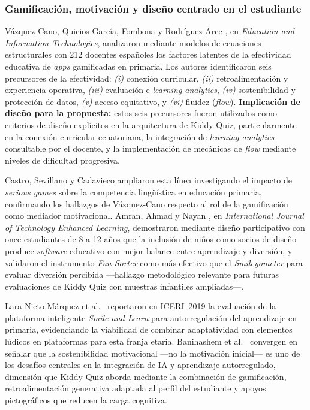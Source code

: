 \subsubsection{Gamificación, motivación y diseño centrado en el estudiante}

Vázquez-Cano, Quicios-García, Fombona y Rodríguez-Arce \cite{vazquezcano2023gamified}, en \textit{Education and Information Technologies}, analizaron mediante modelos de ecuaciones estructurales con 212 docentes españoles los factores latentes de la efectividad educativa de \textit{apps} gamificadas en primaria. Los autores identificaron seis precursores de la efectividad: \textit{(i)} conexión curricular, \textit{(ii)} retroalimentación y experiencia operativa, \textit{(iii)} evaluación e \textit{learning analytics}, \textit{(iv)} sostenibilidad y protección de datos, \textit{(v)} acceso equitativo, y \textit{(vi)} fluidez (\textit{flow}). \textbf{Implicación de diseño para la propuesta:} estos seis precursores fueron utilizados como criterios de diseño explícitos en la arquitectura de Kiddy Quiz, particularmente en la conexión curricular ecuatoriana, la integración de \textit{learning analytics} consultable por el docente, y la implementación de mecánicas de \textit{flow} mediante niveles de dificultad progresiva.

Castro, Sevillano y Cadavieco \cite{castro2024seriousgames,castro2023seriousgames} ampliaron esta línea investigando el impacto de \textit{serious games} sobre la competencia lingüística en educación primaria, confirmando los hallazgos de Vázquez-Cano respecto al rol de la gamificación como mediador motivacional. Amran, Ahmad y Nayan \cite{amran2021design}, en \textit{International Journal of Technology Enhanced Learning}, demostraron mediante diseño participativo con once estudiantes de 8 a 12 años que la inclusión de niños como socios de diseño produce \textit{software} educativo con mejor balance entre aprendizaje y diversión, y validaron el instrumento \textit{Fun Sorter} como más efectivo que el \textit{Smileyometer} para evaluar diversión percibida ---hallazgo metodológico relevante para futuras evaluaciones de Kiddy Quiz con muestras infantiles ampliadas---.

Lara Nieto-Márquez et al.\ \cite{laranietomarquez2019smile} reportaron en ICERI~2019 la evaluación de la plataforma inteligente \textit{Smile and Learn} para autorregulación del aprendizaje en primaria, evidenciando la viabilidad de combinar adaptatividad con elementos lúdicos en plataformas para esta franja etaria. Banihashem et al.\ \cite{banihashem2025aimapping} convergen en señalar que la sostenibilidad motivacional ---no la motivación inicial--- es uno de los desafíos centrales en la integración de IA y aprendizaje autorregulado, dimensión que Kiddy Quiz aborda mediante la combinación de gamificación, retroalimentación generativa adaptada al perfil del estudiante y apoyos pictográficos que reducen la carga cognitiva.

